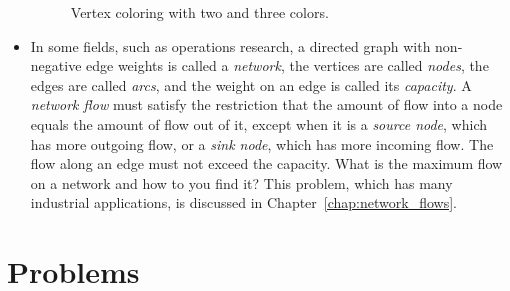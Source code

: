 \begin{itemize}
\begin{figure}[!htbp]
\centering
{}

\caption{Vertex coloring with two and three colors.}
\label{fig:introduction:vertex_coloring}
\end{figure}

\item In some fields, such as operations
  research, a directed graph with non-negative edge weights is called
  a \emph{network}, the vertices are called
  \emph{nodes}, the edges are called \emph{arcs}, and the weight on an
  edge is called its \emph{capacity}. A
  \emph{network flow} must satisfy the restriction
  that the amount of flow into a node equals the amount of flow out of
  it, except when it is a \emph{source node}, which has more outgoing
  flow, or a \emph{sink node}, which has more incoming flow. The flow
  along an edge must not exceed the capacity. What is the maximum flow
  on a network and how to you find it? This problem, which has many
  industrial applications, is discussed in
  Chapter~\ref{chap:network_flows}.
\end{itemize}



\section{Problems}

